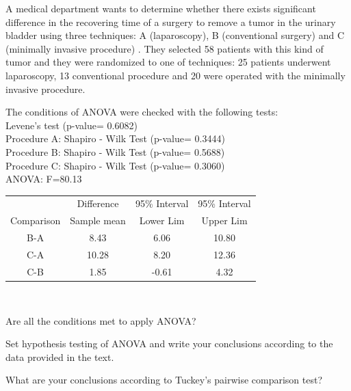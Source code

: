 \begin{problem}
  A medical department wants to determine whether there exists significant difference in
  the recovering time of a surgery to remove a  tumor in the
  urinary bladder using three techniques: A (laparoscopy), B
  (conventional surgery) and  C (minimally invasive procedure) .
  They selected 58 patients with this kind of tumor and they were
  randomized to one of techniques: 25 patients underwent  laparoscopy,
  13 conventional procedure and 20 were operated with the minimally
  invasive procedure.

  The conditions of ANOVA were checked with the following tests: \\
  Levene's test (p-value= 0.6082)\\
Procedure A: Shapiro - Wilk Test (p-value= 0.3444)\\
Procedure B: Shapiro - Wilk Test (p-value= 0.5688)\\
Procedure C: Shapiro - Wilk Test (p-value= 0.3060)\\
ANOVA: F=80.13\\

\begin{tabular}{|c|c|c|c|}
  \hline
   & Difference &  95\%  Interval&  95\% Interval\\
  Comparison & Sample mean & Lower Lim & Upper Lim   \\  \hline
  B-A & 8.43 & 6.06 & 10.80 \\
  C-A & 10.28 & 8.20 & 12.36 \\
  C-B & 1.85 & -0.61 & 4.32 \\
  \hline
\end{tabular}

$ $\\
\begin{parts}
\item Are all the conditions met to apply ANOVA?
 \item Set hypothesis testing of ANOVA and write your conclusions
   according to the data provided in the text.
   \item What are your conclusions according to Tuckey's pairwise
     comparison test?
\end{parts}


\end{problem}

